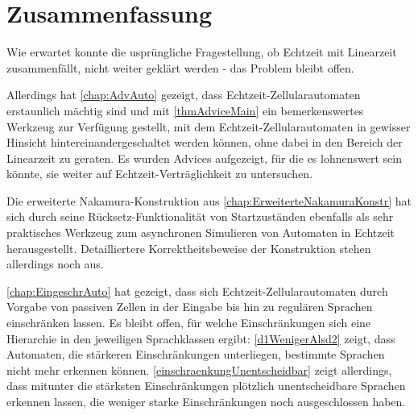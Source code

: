 \chapter{Zusammenfassung}

Wie erwartet konnte die usprüngliche Fragestellung, ob Echtzeit mit Linearzeit zusammenfällt,
nicht weiter geklärt werden - das Problem bleibt offen.

Allerdings hat \cref{chap:AdvAuto} gezeigt, dass Echtzeit-Zellularautomaten erstaunlich mächtig sind
und mit \cref{thmAdviceMain} ein bemerkenswertes Werkzeug zur Verfügung gestellt,
mit dem Echtzeit-Zellularautomaten in gewisser Hinsicht hintereinandergeschaltet werden können,
ohne dabei in den Bereich der Linearzeit zu geraten.
Es wurden Advices aufgezeigt, für die es lohnenswert sein könnte, sie weiter auf Echtzeit-Verträglichkeit zu untersuchen.

Die erweiterte Nakamura-Konstruktion aus \cref{chap:ErweiterteNakamuraKonstr} hat sich durch seine Rücksetz-Funktionalität
von Startzuständen ebenfalls als sehr praktisches Werkzeug zum asynchronen Simulieren von Automaten in Echtzeit herausgestellt.
Detailliertere Korrektheitsbeweise der Konstruktion stehen allerdings noch aus.

\cref{chap:EingeschrAuto} hat gezeigt, dass sich Echtzeit-Zellularautomaten
durch Vorgabe von passiven Zellen in der Eingabe bis hin zu regulären Sprachen einschränken lassen.
Es bleibt offen, für welche Einschränkungen sich eine Hierarchie in den jeweiligen Sprachklassen ergibt:
\cref{d1WenigerAlsd2} zeigt, dass Automaten, die stärkeren Einschränkungen unterliegen, bestimmte Sprachen
nicht mehr erkennen können.
\cref{einschraenkungUnentscheidbar} zeigt allerdings, dass mitunter die stärksten Einschränkungen
plötzlich unentscheidbare Sprachen erkennen lassen, die weniger starke Einschränkungen noch ausgeschlossen haben.
